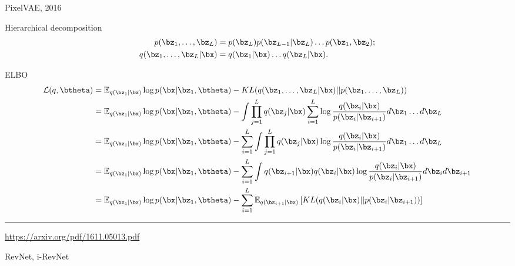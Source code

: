 \begin{frame}{PixelVAE, 2016}
	\begin{block}{Hierarchical decomposition}
		\vspace{-1cm}
		\begin{align*}
			p(\bz_1, \dots, \bz_L) &= p(\bz_L) p(\bz_{L-1} | \bz_L) \dots p(\bz_1, \bz_2); \\
			q(\bz_1, \dots, \bz_L | \bx) &= q(\bz_1 | \bx) \dots q(\bz_L | \bx).
		\end{align*}
	\end{block}
	\vspace{-0.5cm}
	\begin{block}{ELBO}
		\vspace{-0.5cm}
		{\footnotesize
			\begin{align*}
				\mathcal{L}(q, \btheta) &= \mathbb{E}_{q(\bz_1 | \bx)} \log p(\bx | \bz_1, \btheta) - KL(q(\bz_1, \dots, \bz_L | \bx) || p(\bz_1, \dots, \bz_L)) \\
				&= \mathbb{E}_{q(\bz_1 | \bx)} \log p(\bx | \bz_1, \btheta) - \int \prod_{j=1}^L q(\bz_j | \bx) \sum_{i=1}^L \log \frac{q(\bz_i | \bx)}{p(\bz_i | \bz_{i + 1})} d \bz_1 \dots d \bz_L \\
				&= \mathbb{E}_{q(\bz_1 | \bx)} \log p(\bx | \bz_1, \btheta) - \sum_{i=1}^L \int \prod_{j=1}^L q(\bz_j | \bx) \log \frac{q(\bz_i | \bx)}{p(\bz_i | \bz_{i + 1})} d \bz_1 \dots d \bz_L \\
				&= \mathbb{E}_{q(\bz_1 | \bx)} \log p(\bx | \bz_1, \btheta) - \sum_{i=1}^L \int q(\bz_{i+1} | \bx) q(\bz_i | \bx) \log \frac{q(\bz_i | \bx)}{p(\bz_i | \bz_{i + 1})} d \bz_i d \bz_{i+1} \\
				&= \mathbb{E}_{q(\bz_1 | \bx)} \log p(\bx | \bz_1, \btheta) - \sum_{i=1}^L \mathbb{E}_{q(\bz_{i+1} | \bx)} \left[ KL (q(\bz_i | \bx) || p(\bz_i | \bz_{i + 1}))\right]
			\end{align*}
		}
	\end{block}
	\vfill
	\hrule\medskip
	{\scriptsize \href{https://arxiv.org/pdf/1611.05013.pdf}{https://arxiv.org/pdf/1611.05013.pdf}}
\end{frame}
\begin{frame}{RevNet, i-RevNet}
\end{frame}
